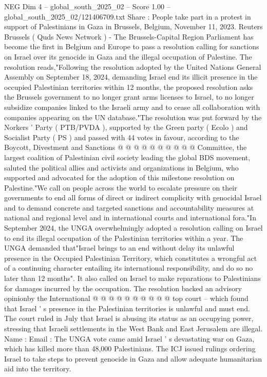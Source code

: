 \begin{textsample}{NEG Dim 4 – global\_south\_2025\_02 – Score 1.00 – global\_south\_2025\_02/121406709.txt}  \label{ex:f4_neg_435}
Share : People take part in a protest in support of Palestinians in Gaza in Brussels, Belgium, November 11, 2023.
Reuters Brussels ( Quds News Network ) - The Brussels-Capital Region Parliament has become the first in Belgium and Europe to pass a resolution calling for sanctions on Israel over its genocide in Gaza and the illegal occupation of Palestine.
The resolution reads,"Following the resolution adopted by the United Nations General Assembly on September 18, 2024, demanding Israel end its illicit presence in the occupied Palestinian territories within 12 months, the proposed resolution asks the Brussels government to no longer grant arms licenses to Israel, to no longer subsidize companies linked to the Israeli army and to cease all collaboration with companies appearing on the UN database."The resolution was put forward by the Norkers ' Party ( PTB/PVDA ), supported by the Green party ( Ecolo ) and Socialist Party ( PS ) and passed with 44 votes in favour, according to the Boycott, Divestment and Sanctions @ @ @ @ @ @ @ @ @ @ Committee, the largest coalition of Palestinian civil society leading the global BDS movement, saluted the political allies and activists and organizations in Belgium, who supported and advocated for the adoption of this milestone resolution on Palestine."We call on people across the world to escalate pressure on their governments to end all forms of direct or indirect complicity with genocidal Israel and to demand concrete and targeted sanctions and accountability measures at national and regional level and in international courts and international fora."In September 2024, the UNGA overwhelmingly adopted a resolution calling on Israel to end its illegal occupation of the Palestinian territories within a year.
The UNGA demanded that"Israel brings to an end without delay its unlawful presence in the Occupied Palestinian Territory, which constitutes a wrongful act of a continuing character entailing its international responsibility, and do so no later than 12 months".
It also called on Israel to make reparations to Palestinians for damages incurred by the occupation.
The resolution backed an advisory opinionby the International @ @ @ @ @ @ @ @ @ @ top court -- which found that Israel ' s presence in the Palestinian territories is unlawful and must end.
The court ruled in July that Israel is abusing its status as an occupying power, stressing that Israeli settlements in the West Bank and East Jerusalem are illegal.
Name : Email : The UNGA vote came amid Israel ' s devastating war on Gaza, which has killed more than 48,000 Palestinians.
The ICJ issued rulings ordering Israel to take steps to prevent genocide in Gaza and allow adequate humanitarian aid into the territory.

\end{textsample}
